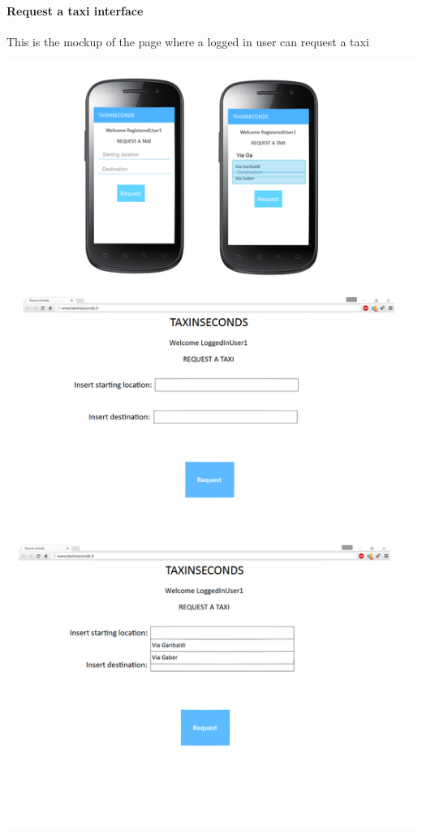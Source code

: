 \documentclass{article}
\begin{document}
\paragraph{Request a taxi interface}
This is the mockup of the page where a logged in user can request a taxi\\
\begin{center}
	\includegraphics[width=.9\textwidth,height=.9\textheight,keepaspectratio]{RequestTaxiInterface}
\end{center}
\clearpage
\end{document}
